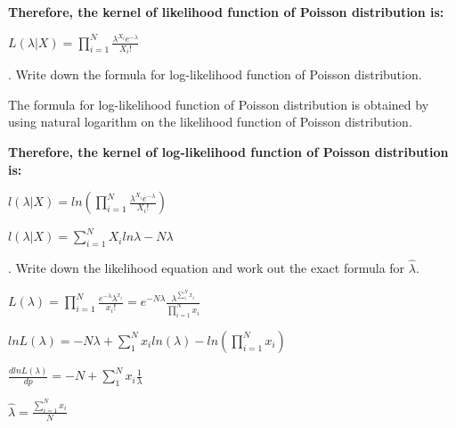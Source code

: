 \documentclass[12pt, oneside]{report}\usepackage[]{graphicx}\usepackage[]{color}
\begin{document}
{\bf Therefore, the kernel of likelihood function of Poisson distribution is:} \newline

$L(\lambda|X) = \displaystyle\prod_{i=1}^{N} \frac{\lambda^{X_i} e^{-\lambda}}{X_i !}$ \newline


. Write down the formula for log-likelihood function of Poisson distribution. \newline

The formula for log-likelihood function of Poisson distribution is obtained by using natural logarithm on the likelihood function of Poisson distribution. \newline

{\bf Therefore, the kernel of log-likelihood function of Poisson distribution is:} \newline

$l(\lambda|X) = ln \left( \displaystyle\prod_{i=1}^{N} \frac{\lambda^{X_i} e^{-\lambda}}{X_i !} \right)$ \newline

$l(\lambda|X) = \displaystyle\sum_{i=1}^{N} X_i ln \lambda - N \lambda$ \newline

. Write down the likelihood equation and work out the exact formula for $\hat{\lambda}$. \newline

$L(\lambda) =  \displaystyle\prod_{i=1}^{N} \frac{e^{-\lambda}\lambda^{x_i}}{x_i !} = e^{-N\lambda} \frac{\lambda^{\sum_{1}^{N}x_i}}{\prod_{i=1}^{N} x_i}$ \newline

$ln L(\lambda) = -N\lambda + \displaystyle\sum_{1}^{N}x_iln(\lambda) - ln\left(\displaystyle\prod_{i=1}^{N} x_i\right)$ \newline

$\frac{dlnL(\lambda)}{dp} = -N + \displaystyle\sum_{1}^{N} x_i \frac{1}{\lambda}$ \newline

$\hat{\lambda} = \frac{\sum_{i=1}^{N}x_i}{N}$ \newline
\end{document}
